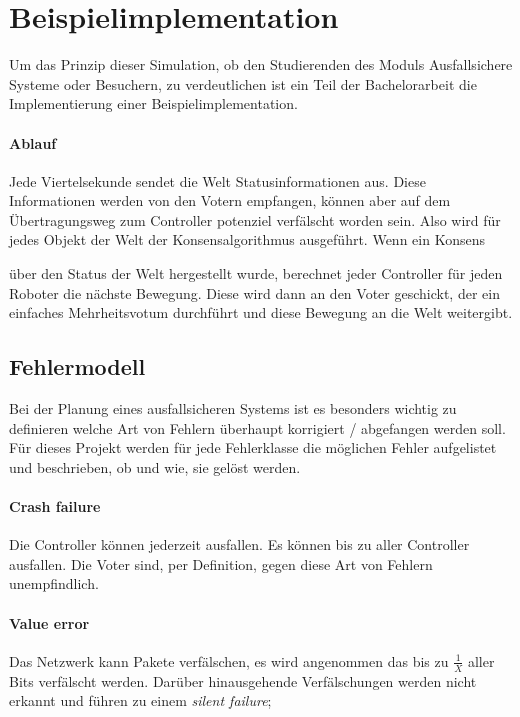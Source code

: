 \documentclass[
    12pt,
    bibliography=totoc,
    ngerman
]{scrartcl}
\begin{document}
\clearpage
\section{Beispielimplementation}
Um das Prinzip dieser Simulation, ob den Studierenden des Moduls Ausfallsichere Systeme oder Besuchern, zu verdeutlichen ist ein Teil der Bachelorarbeit die Implementierung einer
Beispielimplementation.

\paragraph{Ablauf} Jede Viertelsekunde sendet die Welt Statusinformationen aus.  Diese Informationen werden von den Votern empfangen, k{\"{o}}nnen
aber auf dem {\"{U}}bertragungsweg zum Controller potenziel verf{\"{a}}lscht worden sein. Also wird f{\"{u}}r jedes Objekt der Welt der Konsensalgorithmus ausgef{\"{u}}hrt. Wenn ein Konsens {\"{u}ber den Status der Welt hergestellt wurde, berechnet 
jeder Controller f{\"{u}}r jeden Roboter die n{\"{a}}chste Bewegung. Diese wird dann an den Voter geschickt, der ein einfaches Mehrheitsvotum durchf{\"{u}}hrt und diese Bewegung an die Welt weitergibt.

\subsection{Fehlermodell}
\label{error-model}
Bei der Planung eines ausfallsicheren Systems ist es besonders wichtig zu definieren welche Art von Fehlern
{\"{u}}berhaupt korrigiert / abgefangen werden soll. F{\"{u}}r dieses Projekt werden f{\"{u}}r jede Fehlerklasse
die m{\"{o}}glichen Fehler aufgelistet und beschrieben, ob und wie, sie gel{\"{o}}st werden.

\paragraph{Crash failure} Die Controller k{\"{o}}nnen jederzeit ausfallen. Es k{\"{o}}nnen bis zu  aller Controller ausfallen.
Die Voter sind, per Definition, gegen diese Art von Fehlern unempfindlich.

\paragraph{Value error} Das Netzwerk kann Pakete verf{\"{a}}lschen, es wird angenommen das bis zu $\frac{1}{X}$ aller Bits verf{\"{a}}lscht werden.
Dar{\"{u}}ber hinausgehende Verf{\"{a}}lschungen werden nicht erkannt und f{\"{u}}hren zu einem \textit{silent failure}; 

}
\end{document}
